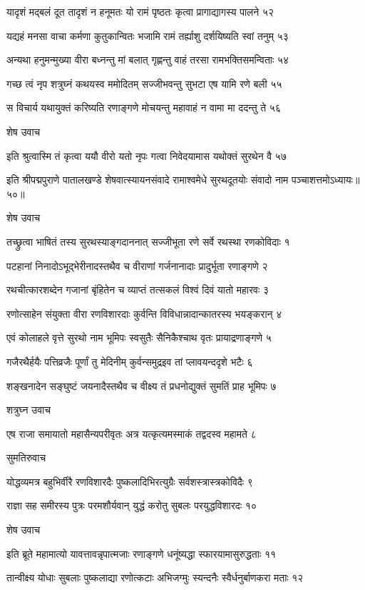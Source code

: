 यादृशं मद्बलं दूत तादृशं न हनूमतः
यो रामं पृष्ठतः कृत्वा प्रागाद्यागस्य पालने ५२

यद्यहं मनसा वाचा कर्मणा कुतुकान्वितः
भजामि रामं तर्ह्याशु दर्शयिष्यति स्वां तनुम् ५३

अन्यथा हनुमन्मुख्या वीरा बध्नन्तु मां बलात्
गृह्णन्तु वाहं तरसा रामभक्तिसमन्विताः ५४

गच्छ त्वं नृप शत्रुघ्नं कथयस्व ममोदितम्
सज्जीभवन्तु सुभटा एष यामि रणे बली ५५

स विचार्य यथायुक्तं करिष्यति रणाङ्गणे
मोचयन्तु महावाहं न वामा मा ददन्तु ते ५६

शेष उवाच

इति श्रुत्वास्मि तं कृत्वा ययौ वीरो यतो नृपः
गत्वा निवेदयामास यथोक्तं सुरथेन वै ५७

इति श्रीपद्मपुराणे पातालखण्डे शेषवात्स्यायनसंवादे रामाश्वमेधे सुरथदूतयोः संवादो नाम पञ्चाशत्तमोऽध्यायः॥५०॥


शेष उवाच

तच्छ्रुत्वा भाषितं तस्य सुरथस्याङ्गदाननात्
सज्जीभूता रणे सर्वे रथस्था रणकोविदाः १

पटहानां निनादोऽभूद्भेरीनादस्तथैव च
वीराणां गर्जनानादाः प्रादुर्भूता रणाङ्गणे २

रथचीत्कारशब्देन गजानां बृंहितेन च
व्याप्तं तत्सकलं विश्वं दिवं यातो महारवः ३

रणोत्साहेन संयुक्ता वीरा रणविशारदाः
कुर्वन्ति विविधान्नादान्कातरस्य भयङ्करान् ४

एवं कोलाहले वृत्ते सुरथो नाम भूमिपः
स्वसुतैः सैनिकैश्चाथ वृतः प्रायाद्रणाङ्गणे ५

गजैरथैर्हयैः पत्तिव्रजैः पूर्णां तु मेदिनीम्
कुर्वन्समुद्रइव तां प्लावयन्ददृशे भटैः ६

शङ्खनादेन सङ्घुष्टं जयनादैस्तथैव च
वीक्ष्य तं प्रधनोद्युक्तं सुमतिं प्राह भूमिपः ७

शत्रुघ्न उवाच

एष राजा समायातो महासैन्यपरीवृतः
अत्र यत्कृत्यमस्माकं तद्वदस्व महामते ८

सुमतिरुवाच

योद्धव्यमत्र बहुभिर्वीरै रणविशारदैः
पुष्कलादिभिरत्युग्रैः सर्वशस्त्रास्त्रकोविदैः ९

राज्ञा सह समीरस्य पुत्रः परमशौर्यवान्
युद्धं करोतु सुबलः परयुद्धविशारदः १०

शेष उवाच

इति ब्रूते महामात्यो यावत्तावन्नृपात्मजाः
रणाङ्गणे धनूंष्यद्धा स्फारयामासुरुद्धताः ११

तान्वीक्ष्य योधाः सुबलाः पुष्कलाद्या रणोत्कटाः
अभिजग्मुः स्यन्दनैः स्वैर्धनुर्बाणकरा मताः १२

